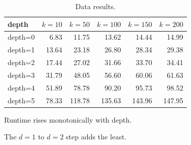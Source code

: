 \begin{table}[H]
\centering
\caption{Data results.}
\small
\setlength{\tabcolsep}{6pt}
\begin{tabular}{lrrrrr}
\toprule
\textbf{depth} & \textbf{$k{=}10$} & \textbf{$k{=}50$} & \textbf{$k{=}100$} & \textbf{$k{=}150$} & \textbf{$k{=}200$} \\
\midrule
  depth=0 & \cellcolor[HTML]{63BE7B}6.83 & \cellcolor[HTML]{63BE7B}11.75 & \cellcolor[HTML]{63BE7B}13.62 & \cellcolor[HTML]{63BE7B}14.44 & \cellcolor[HTML]{63BE7B}14.99 \\
  depth=1 & \cellcolor[HTML]{81C77D}13.64 & \cellcolor[HTML]{84C87D}23.18 & \cellcolor[HTML]{85C87D}26.80 & \cellcolor[HTML]{84C87D}28.34 & \cellcolor[HTML]{85C87D}29.38 \\
  depth=2 & \cellcolor[HTML]{91CB7E}17.44 & \cellcolor[HTML]{90CB7E}27.02 & \cellcolor[HTML]{91CB7E}31.66 & \cellcolor[HTML]{91CB7E}33.70 & \cellcolor[HTML]{91CB7E}34.41 \\
  depth=3 & \cellcolor[HTML]{D0DD81}31.79 & \cellcolor[HTML]{CDDD81}48.05 & \cellcolor[HTML]{D1DE81}56.60 & \cellcolor[HTML]{D1DE81}60.06 & \cellcolor[HTML]{D0DE81}61.63 \\
  depth=4 & \cellcolor[HTML]{FDC97D}51.89 & \cellcolor[HTML]{FDCA7E}78.78 & \cellcolor[HTML]{FDCA7E}90.20 & \cellcolor[HTML]{FDCA7E}95.73 & \cellcolor[HTML]{FDCA7E}98.52 \\
  depth=5 & \cellcolor[HTML]{F8696B}78.33 & \cellcolor[HTML]{F8696B}118.78 & \cellcolor[HTML]{F8696B}135.63 & \cellcolor[HTML]{F8696B}143.96 & \cellcolor[HTML]{F8696B}147.95 \\
\bottomrule
\end{tabular}
\end{table}


\begin{insights}
\begin{sentences}
\item Runtime rises monotonically with depth.
\item The $d{=}1$ to $d{=}2$ step adds the least.
\end{sentences}
\end{insights}


